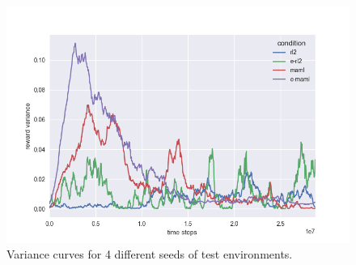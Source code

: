 \documentclass{article} %
\begin{document}
\begin{figure}[H]
\begin{center}
\includegraphics[scale=0.16]{bradly_curves/64testgridvar3.png}
\end{center}
\caption{Variance curves for 4 different seeds of test environments.}
\label{fig:apprendix-variance-curves-1}
\end{figure} 
\end{document}
